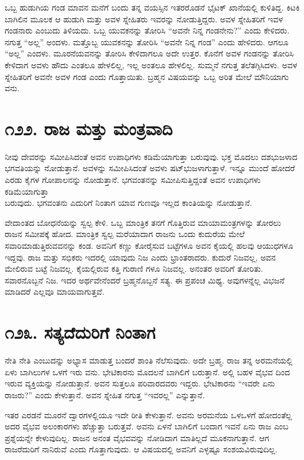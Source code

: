 ಒಬ್ಬ ಹುಡುಗಿಯ ಗಂಡ ಮಾವನ ಮನೆಗೆ ಬಂದು ತನ್ನ ವಯಸ್ಸಿನ ಇತರರೊಡನೆ ಭೈಟಕ್ ಖಾನೆಯಲ್ಲಿ ಕುಳಿತಿದ್ದ. ಕಿಟಕಿ ಬಾಗಿಲಿನ ಮೂಲಕ ಆ ಹುಡುಗಿ ಮತ್ತು ಅವಳ ಸ್ನೇಹಿತರು ಇವರನ್ನು ನೋಡುತ್ತಿದ್ದರು. ಅವಳ ಸ್ನೇಹಿತರಿಗೆ ಇವಳ ಗಂಡನಾರು ಎಂಬುದು ತಿಳಿಯದು. ಒಬ್ಬ ಯುವಕನನ್ನು ತೋರಿಸಿ “ಅವನೇ ನಿನ್ನ ಗಂಡನೇನು?” ಎಂದು ಕೇಳಿದರು. ನಗುತ್ತ “ಅಲ್ಲ” ಅಂದಳು. ಮತ್ತೊಬ್ಬ ಯುವಕನನ್ನು ತೋರಿಸಿ “ಅವನೇ ನಿನ್ನ ಗಂಡ” ಎಂದು ಹೇಳಿದರು. ಆಗಲೂ “ಅಲ್ಲ” ಎಂದಳು. ಮೂರನೆಯವನನ್ನು ತೋರಿಸಿ ಕೇಳಿದಾಗಲೂ ಅದೇ ಉತ್ತರ. ಕೊನೆಗೆ ಅವಳ ಗಂಡನನ್ನು ತೋರಿಸಿ ಕೇಳಿದಾಗ ಅವಳು ಹೌದು ಎಂತಲೂ ಹೇಳಲಿಲ್ಲ, ಇಲ್ಲ ಅಂತಲೂ ಹೇಳಲಿಲ್ಲ. ಸುಮ್ಮನೆ ನಗುತ್ತ ತಲೆತಗ್ಗಿಸಿದಳು. ಅವಳ ಸ್ನೇಹಿತರಿಗೆ ಅವನೇ ಅವಳ ಗಂಡ ಎಂದು ಗೊತ್ತಾಯಿತು. ಬ್ರಹ್ಮನ ವಿಷಯವನ್ನು ಒಬ್ಬ ಅರಿತ ಮೇಲೆ ಮೌನಿಯಾಗು ವನು.


\section{\num{೧೨೨. } ರಾಜ ಮತ್ತು ಮಂತ್ರವಾದಿ}

ನೀವು ದೇವರನ್ನು ಸಮೀಪಿಸಿದಂತೆ ಅವನ ಉಪಾಧಿಗಳು ಕಡಿಮೆಯಾಗುತ್ತಾ ಬರುವುವು. ಭಕ್ತ ಮೊದಲು ದಶಭುಜಳಾದ ಭಗವತಿಯನ್ನು ನೋಡುತ್ತಾನೆ. ಅವಳನ್ನು ಸಮೀಪಿಸಿದಂತೆ ಅವಳು ಷಟ್​ಭುಜಳಾಗುತ್ತಾಳೆ. ಇನ್ನೂ ಮುಂದೆ ಹೋದರೆ ಎರಡು ಕೈಗಳ ಗೋಪಾಲನನ್ನು ನೋಡುತ್ತಾನೆ. ಭಗವಂತನನ್ನು ಸಮೀಪಿಸುತ್ತಿದ್ದಂತೆ ಅವನ ಉಪಾಧಿಗಳು ಕಡಿಮೆಯಾಗುತ್ತಾ\\ಬರುವುದು. ಭಗವಂತನು ಎದುರಿಗೆ ನಿಂತಾಗ ಯಾವ ಗುಣವೂ ಇಲ್ಲದ ಕಾಂತಿಯನ್ನು ನೋಡುತ್ತಾನೆ.

ವೇದಾಂತದ ಬೋಧನೆಯನ್ನು ಸ್ವಲ್ಪ ಕೇಳಿ. ಒಬ್ಬ ಮಾಂತ್ರಿಕ ತನಗೆ ಗೊತ್ತಿರುವ ಮಾಯಾಮಂತ್ರಗಳನ್ನು ತೋರಲು ರಾಜನ ಸಮೀಪಕ್ಕೆ ಹೋದ. ಮಾಂತ್ರಿಕ ಸ್ವಲ್ಪ ಮರೆಯಾದಾಗ ರಾಜನು ಒಂದು ಕುದುರೆಯ ಮೇಲೆ ಸವಾರಿಮಾಡುತ್ತಿರುವವನನ್ನು ಕಂಡ. ಅವನಿಗೆ ಕಣ್ಣು ಕೋರೈಸುವ ಬಟ್ಟೆಗಳೂ ಅವನ ಕೈಯಲ್ಲಿ ಹಲವು ಆಯುಧಗಳೂ ಇದ್ದವು. ರಾಜ ಮತ್ತು ಸಭಿಕರು ಇದರಲ್ಲಿ ಯಾವುದು ನಿಜ ಎಂದು ಭ್ರಾಂತರಾದರು. ಕುದುರೆ ನಿಜವಲ್ಲ, ಅವನ ಮೇಲಿರುವ ಬಟ್ಟೆ ನಿಜವಲ್ಲ. ಕೈಯಲ್ಲಿರುವ ಕತ್ತಿ ಗುರಾಣಿ ಗಳೂ ನಿಜವಲ್ಲ. ಅನಂತರ ಅವರಿಗೆ ತೋರಿತು. ಸವಾರನೊಬ್ಬನೆ ನಿಜ. ಇದರ ಅರ್ಥವೇನೆಂದರೆ ಬ್ರಹ್ಮನೊಬ್ಬನೆ ಸತ್ಯ. ಈ ಪ್ರಪಂಚ ಮಿಥ್ಯ. ಅವುಗಳನ್ನೆಲ್ಲ ವಿಭಜನೆ ಮಾಡಿದರೆ ಎಲ್ಲವೂ ಮಾಯವಾಗುತ್ತವೆ.


\section{\num{೧೨೩. } ಸತ್ಯದೆದುರಿಗೆ ನಿಂತಾಗ}

ನೇತಿ ನೇತಿ ಎಂಬುದನ್ನು ಅಭ್ಯಾಸ ಮಾಡುತ್ತ ಬಂದರೆ ಶಾಂತಿ ನೆಲೆಸುವುದು. ಅದೇ ಬ್ರಹ್ಮ. ರಾಜ ತನ್ನ ಅರಮನೆಯಲ್ಲಿ ಏಳು ಬಾಗಿಲುಗಳ ಒಳಗೆ ಇರು ವನು. ಭೇಟಿಕಾರನು ಮೊದಲನೆ ಬಾಗಿಲಿಗೆ ಬರುತ್ತಾನೆ. ಅಲ್ಲಿ ಬಹಳ ವೈಭವ ದಿಂದ ಇರುವ ವ್ಯಕ್ತಿಯನ್ನು ನೋಡುತ್ತಾನೆ. ಅವನ ಸುತ್ತಲೂ ಪರಿವಾರದವರು ಇದ್ದರು. ಭೇಟಿಕಾರನು “ಇವರೇ ಏನು ರಾಜರು?” ಎಂದು ಕೇಳುತ್ತಾನೆ. ಅವನ ಸ್ನೇಹಿತ ನಗುತ್ತ “ಇವರಲ್ಲ” ಎನ್ನುತ್ತಾನೆ.

ಇತರ ಎರಡನೆ ಮೂರನೆ ದ್ವಾರಗಳಲ್ಲಿಯೂ ಇದೇ ರೀತಿ ಕೇಳುತ್ತಾನೆ. ಅವನು ಅರಮನೆಯ ಒಳಒಳಗೆ ಹೋದಂತೆಲ್ಲ ಅದರ ವೈಭವ ಅಲಂಕಾರಗಳು ಹೆಚ್ಚುತ್ತಾ ಬರುತ್ತವೆ. ಅವನು ಏಳನೆ ಬಾಗಿಲಿಗೆ ಬಂದಾಗ ಇವನೆ ಏನು ರಾಜ ಎಂಬ ಪ್ರಶ್ನೆಯನ್ನೇ ಕೇಳುವುದಿಲ್ಲ. ರಾಜನ ಅನಂತ ವೈಭವವನ್ನು ನೋಡಿದಾಗ ಮಾತಿಲ್ಲದೆ ಮೂಕನಾಗುತ್ತಾನೆ. ಆಗ ರಾಜರೆದುರಿಗೆ ನಾನಿರುವೆ ಎಂದು ಗೊತ್ತಾಗುವುದು. ಆ ವಿಷಯದಲ್ಲಿ ಅವನಿಗೆ ಎಳ್ಳಷ್ಟೂ ಸಂಶಯವಿರುವುದಿಲ್ಲ.


